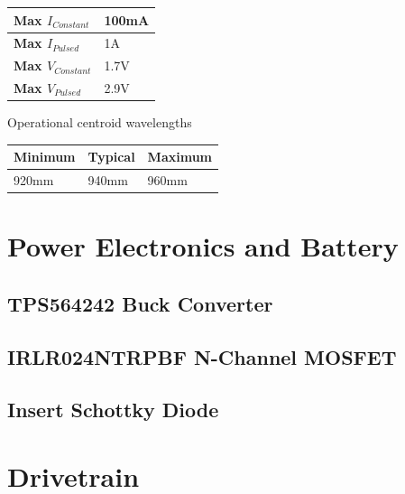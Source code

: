 \documentclass[10pt, letterpaper]{article}
\begin{document}
            \begin{center}
            \begin{tabular}{ll}
            
                \toprule
                \textbf{Max $I_{Constant}$} & 100mA \\ 
                \midrule
                \textbf{Max $I_{Pulsed}$} & 1A \\
                \midrule
                \textbf{Max $V_{Constant}$} & 1.7V \\ 
                \midrule
                \textbf{Max $V_{Pulsed}$} & 2.9V \\                
                \bottomrule
                
            \end{tabular}
            \end{center}

            \begin{flushleft}
            Operational centroid wavelengths
            \end{flushleft}

            \begin{center}
            \begin{tabular}{lll}
            
                \toprule
                \textbf{Minimum} & \textbf{Typical} & \textbf{Maximum} \\
                \midrule
                920mm & 940mm & 960mm \\
                \bottomrule
                
            \end{tabular}
            \end{center}


\section{Power Electronics and Battery}
    \subsection{TPS564242 Buck Converter}
    \subsection{IRLR024NTRPBF N-Channel MOSFET}
    \subsection{Insert Schottky Diode}

\section{Drivetrain}
\end{document}
